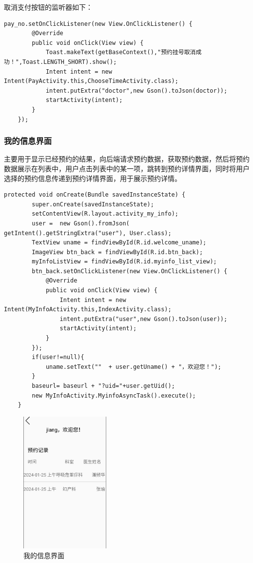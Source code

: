 \documentclass[UTF8,12pt]{article}
\begin{document}
取消支付按钮的监听器如下：

\begin{lstlisting}[frame=shadowbox]
    pay_no.setOnClickListener(new View.OnClickListener() {
        @Override
        public void onClick(View view) {
            Toast.makeText(getBaseContext(),"预约挂号取消成功！",Toast.LENGTH_SHORT).show();
            Intent intent = new Intent(PayActivity.this,ChooseTimeActivity.class);
            intent.putExtra("doctor",new Gson().toJson(doctor));
            startActivity(intent);
        }
    });
\end{lstlisting}

\subsubsection{我的信息界面}
主要用于显示已经预约的结果，向后端请求预约数据，获取预约数据，然后将预约数据展示在列表中，用户点击列表中的某一项，跳转到预约详情界面，同时将用户选择的预约信息传递到预约详情界面，用于展示预约详情。

\begin{lstlisting}[frame=shadowbox]
    protected void onCreate(Bundle savedInstanceState) {
        super.onCreate(savedInstanceState);
        setContentView(R.layout.activity_my_info);
        user =  new Gson().fromJson( getIntent().getStringExtra("user"), User.class);
        TextView uname = findViewById(R.id.welcome_uname);
        ImageView btn_back = findViewById(R.id.btn_back);
        myInfoListView = findViewById(R.id.myinfo_list_view);
        btn_back.setOnClickListener(new View.OnClickListener() {
            @Override
            public void onClick(View view) {
                Intent intent = new Intent(MyInfoActivity.this,IndexActivity.class);
                intent.putExtra("user",new Gson().toJson(user));
                startActivity(intent);
            }
        });
        if(user!=null){
            uname.setText(""  + user.getUname() + "，欢迎您！");
        }
        baseurl= baseurl + "?uid="+user.getUid();
        new MyInfoActivity.MyinfoAsyncTask().execute();
    }
\end{lstlisting}

\begin{figure}[htbp]
    \centering
    \includegraphics[width=0.4\textwidth]{imgs/26.png}
    \caption{我的信息界面}
\end{figure}
\end{document}

